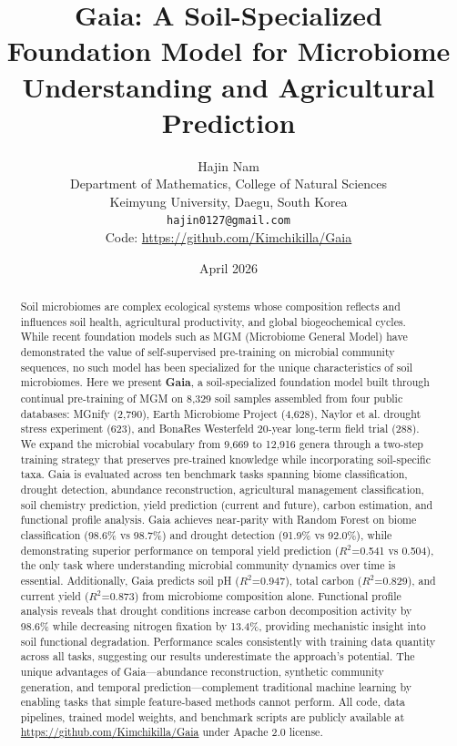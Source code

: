 \documentclass[11pt,a4paper]{article}
\title{\textbf{Gaia: A Soil-Specialized Foundation Model for Microbiome Understanding and Agricultural Prediction}}
\author{
  Hajin Nam \\
  Department of Mathematics, College of Natural Sciences \\
  Keimyung University, Daegu, South Korea \\
  \texttt{hajin0127@gmail.com} \\
  Code: \url{https://github.com/Kimchikilla/Gaia}
}
\date{April 2026}
\begin{document}
\maketitle

\begin{abstract}
Soil microbiomes are complex ecological systems whose composition reflects and influences soil health, agricultural productivity, and global biogeochemical cycles. While recent foundation models such as MGM (Microbiome General Model) have demonstrated the value of self-supervised pre-training on microbial community sequences, no such model has been specialized for the unique characteristics of soil microbiomes. Here we present \textbf{Gaia}, a soil-specialized foundation model built through continual pre-training of MGM on 8,329 soil samples assembled from four public databases: MGnify (2,790), Earth Microbiome Project (4,628), Naylor et al. drought stress experiment (623), and BonaRes Westerfeld 20-year long-term field trial (288). We expand the microbial vocabulary from 9,669 to 12,916 genera through a two-step training strategy that preserves pre-trained knowledge while incorporating soil-specific taxa. Gaia is evaluated across ten benchmark tasks spanning biome classification, drought detection, abundance reconstruction, agricultural management classification, soil chemistry prediction, yield prediction (current and future), carbon estimation, and functional profile analysis. Gaia achieves near-parity with Random Forest on biome classification (98.6\% vs 98.7\%) and drought detection (91.9\% vs 92.0\%), while demonstrating superior performance on temporal yield prediction ($R^2$=0.541 vs 0.504), the only task where understanding microbial community dynamics over time is essential. Additionally, Gaia predicts soil pH ($R^2$=0.947), total carbon ($R^2$=0.829), and current yield ($R^2$=0.873) from microbiome composition alone. Functional profile analysis reveals that drought conditions increase carbon decomposition activity by 98.6\% while decreasing nitrogen fixation by 13.4\%, providing mechanistic insight into soil functional degradation. Performance scales consistently with training data quantity across all tasks, suggesting our results underestimate the approach's potential. The unique advantages of Gaia—abundance reconstruction, synthetic community generation, and temporal prediction—complement traditional machine learning by enabling tasks that simple feature-based methods cannot perform. All code, data pipelines, trained model weights, and benchmark scripts are publicly available at \url{https://github.com/Kimchikilla/Gaia} under Apache 2.0 license.
\end{abstract}
\end{document}
